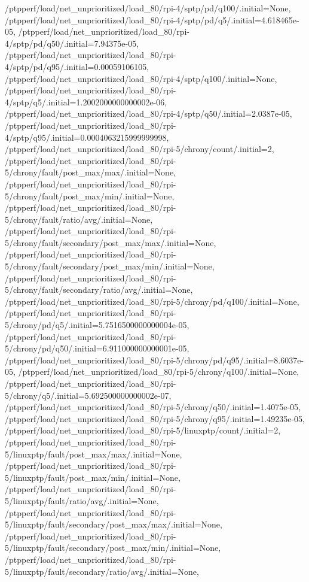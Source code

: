 {    /ptpperf/load/net_unprioritized/load_80/rpi-4/sptp/pd/q100/.initial=None,
    /ptpperf/load/net_unprioritized/load_80/rpi-4/sptp/pd/q5/.initial=4.618465e-05,
    /ptpperf/load/net_unprioritized/load_80/rpi-4/sptp/pd/q50/.initial=7.94375e-05,
    /ptpperf/load/net_unprioritized/load_80/rpi-4/sptp/pd/q95/.initial=0.00059106105,
    /ptpperf/load/net_unprioritized/load_80/rpi-4/sptp/q100/.initial=None,
    /ptpperf/load/net_unprioritized/load_80/rpi-4/sptp/q5/.initial=1.2002000000000002e-06,
    /ptpperf/load/net_unprioritized/load_80/rpi-4/sptp/q50/.initial=2.0387e-05,
    /ptpperf/load/net_unprioritized/load_80/rpi-4/sptp/q95/.initial=0.0004063215999999998,
    /ptpperf/load/net_unprioritized/load_80/rpi-5/chrony/count/.initial=2,
    /ptpperf/load/net_unprioritized/load_80/rpi-5/chrony/fault/post_max/max/.initial=None,
    /ptpperf/load/net_unprioritized/load_80/rpi-5/chrony/fault/post_max/min/.initial=None,
    /ptpperf/load/net_unprioritized/load_80/rpi-5/chrony/fault/ratio/avg/.initial=None,
    /ptpperf/load/net_unprioritized/load_80/rpi-5/chrony/fault/secondary/post_max/max/.initial=None,
    /ptpperf/load/net_unprioritized/load_80/rpi-5/chrony/fault/secondary/post_max/min/.initial=None,
    /ptpperf/load/net_unprioritized/load_80/rpi-5/chrony/fault/secondary/ratio/avg/.initial=None,
    /ptpperf/load/net_unprioritized/load_80/rpi-5/chrony/pd/q100/.initial=None,
    /ptpperf/load/net_unprioritized/load_80/rpi-5/chrony/pd/q5/.initial=5.7516500000000004e-05,
    /ptpperf/load/net_unprioritized/load_80/rpi-5/chrony/pd/q50/.initial=6.911000000000001e-05,
    /ptpperf/load/net_unprioritized/load_80/rpi-5/chrony/pd/q95/.initial=8.6037e-05,
    /ptpperf/load/net_unprioritized/load_80/rpi-5/chrony/q100/.initial=None,
    /ptpperf/load/net_unprioritized/load_80/rpi-5/chrony/q5/.initial=5.692500000000002e-07,
    /ptpperf/load/net_unprioritized/load_80/rpi-5/chrony/q50/.initial=1.4075e-05,
    /ptpperf/load/net_unprioritized/load_80/rpi-5/chrony/q95/.initial=1.49235e-05,
    /ptpperf/load/net_unprioritized/load_80/rpi-5/linuxptp/count/.initial=2,
    /ptpperf/load/net_unprioritized/load_80/rpi-5/linuxptp/fault/post_max/max/.initial=None,
    /ptpperf/load/net_unprioritized/load_80/rpi-5/linuxptp/fault/post_max/min/.initial=None,
    /ptpperf/load/net_unprioritized/load_80/rpi-5/linuxptp/fault/ratio/avg/.initial=None,
    /ptpperf/load/net_unprioritized/load_80/rpi-5/linuxptp/fault/secondary/post_max/max/.initial=None,
    /ptpperf/load/net_unprioritized/load_80/rpi-5/linuxptp/fault/secondary/post_max/min/.initial=None,
    /ptpperf/load/net_unprioritized/load_80/rpi-5/linuxptp/fault/secondary/ratio/avg/.initial=None,
}
